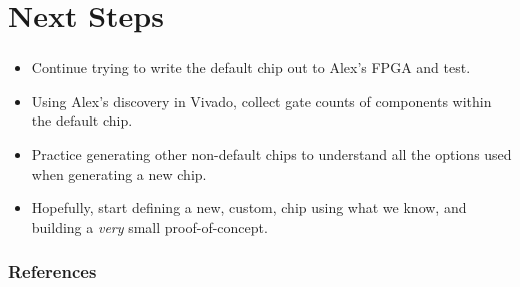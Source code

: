 \documentclass{../weeklyslides}
\begin{document}
\section{Next Steps}\label{sec:Next_Steps}
\begin{frame}
  \frametitle{}
  \begin{itemize}
  \item Continue trying to write the default chip out to Alex's FPGA and test.
  \item Using Alex's discovery in Vivado, collect gate counts of components within the default chip.
  \item Practice generating other non-default chips to understand all the options used when generating a new chip.
  \item Hopefully, start defining a new, custom, chip using what we know, and building a \emph{very} small proof-of-concept.
  \end{itemize}
\end{frame}

\begin{frame}
  \frametitle{References}
  \printbibliography[heading=bibintoc]{}
\end{frame}
\end{document}
